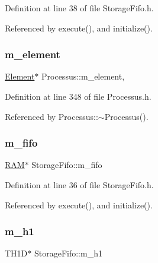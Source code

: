 Definition at line 38 of file Storage\+Fifo.\+h.



Referenced by execute(), and initialize().

\mbox{\label{classProcessus_aa9d24d53c3e52f36786cabb5d8e296e7}} 
\subsubsection{\texorpdfstring{m\+\_\+element}{m\_element}}
{\footnotesize\ttfamily \hyperlink{classElement}{Element}$\ast$ Processus\+::m\+\_\+element\hspace{0.3cm}{\ttfamily [protected]}, {\ttfamily [inherited]}}



Definition at line 348 of file Processus.\+h.



Referenced by Processus\+::$\sim$\+Processus().

\mbox{\label{classStorageFifo_a4b1f3eb44df4f2d46a8a62189d662390}} 
\subsubsection{\texorpdfstring{m\+\_\+fifo}{m\_fifo}}
{\footnotesize\ttfamily \hyperlink{classRAM}{R\+AM}$\ast$ Storage\+Fifo\+::m\+\_\+fifo\hspace{0.3cm}{\ttfamily [private]}}



Definition at line 36 of file Storage\+Fifo.\+h.



Referenced by execute(), and initialize().

\mbox{\label{classStorageFifo_abe762844e442bc8188643b18b276d801}} 
\subsubsection{\texorpdfstring{m\+\_\+h1}{m\_h1}}
{\footnotesize\ttfamily T\+H1D$\ast$ Storage\+Fifo\+::m\+\_\+h1\hspace{0.3cm}{\ttfamily [private]}}



